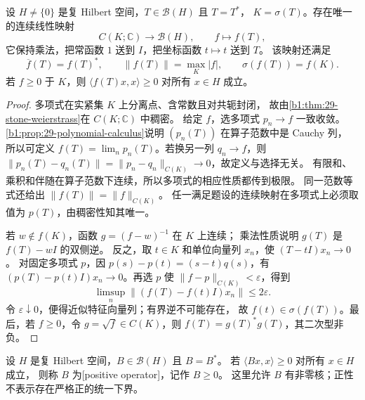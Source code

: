 \begin{theorem}[连续函数演算]
\label{b1:thm:29-continuous-calculus}
设 \(H\ne\{0\}\) 是复 Hilbert 空间，\(T\in\mathcal B(H)\) 且 \(T=T^*\)，
\(K=\sigma(T)\)。存在唯一的连续线性映射
\[
 C(K;\mathbb C)\longrightarrow\mathcal B(H),\qquad f\longmapsto f(T),
\]
它保持乘法，把常函数 \(1\) 送到 \(I\)，把坐标函数 \(t\mapsto t\) 送到 \(T\)。
该映射还满足
\[
 \overline f(T)=f(T)^*,\qquad
 \|f(T)\|=\max_K|f|,\qquad
 \sigma(f(T))=f(K).
\]
若 \(f\geq0\) 于 \(K\)，则 \(\langle f(T)x,x\rangle\geq0\) 对所有 \(x\in H\) 成立。
\end{theorem}
\begin{proof}
多项式在实紧集 \(K\) 上分离点、含常数且对共轭封闭，
故由\cref{b1:thm:29-stone-weierstrass}在 \(C(K;\mathbb C)\) 中稠密。
给定 \(f\)，选多项式 \(p_n\to f\) 一致收敛。
\cref{b1:prop:29-polynomial-calculus}说明 \((p_n(T))\) 在算子范数中是 Cauchy 列，
所以可定义 \(f(T)=\lim_n p_n(T)\)。若换另一列 \(q_n\to f\)，则
\(\|p_n(T)-q_n(T)\|=\|p_n-q_n\|_{C(K)}\to0\)，故定义与选择无关。
有限和、乘积和伴随在算子范数下连续，所以多项式的相应性质都传到极限。
同一范数等式还给出 \(\|f(T)\|=\|f\|_{C(K)}\)。
任一满足题设的连续映射在多项式上必须取值为 \(p(T)\)，由稠密性知其唯一。

若 \(w\notin f(K)\)，函数 \(g=(f-w)^{-1}\) 在 \(K\) 上连续；
乘法性质说明 \(g(T)\) 是 \(f(T)-wI\) 的双侧逆。
反之，取 \(t\in K\) 和单位向量列 \(x_n\)，使 \((T-tI)x_n\to0\)。
对固定多项式 \(p\)，因 \(p(s)-p(t)=(s-t)q(s)\)，有
\((p(T)-p(t)I)x_n\to0\)。再选 \(p\) 使 \(\|f-p\|_{C(K)}<\varepsilon\)，得到
\[
 \limsup_n\|(f(T)-f(t)I)x_n\|\leq2\varepsilon.
\]
令 \(\varepsilon\downarrow0\)，便得近似特征向量列；有界逆不可能存在，
故 \(f(t)\in\sigma(f(T))\)。最后，若 \(f\geq0\)，令 \(g=\sqrt f\in C(K)\)，则
\(f(T)=g(T)^*g(T)\)，其二次型非负。
\end{proof}

\begin{definition}[正算子]
\label{b1:def:29-positive-operator}
设 \(H\) 是复 Hilbert 空间，\(B\in\mathcal B(H)\) 且 \(B=B^*\)。
若 \(\langle Bx,x\rangle\geq0\) 对所有 \(x\in H\) 成立，
则称 \(B\) 为[positive operator]，记作 \(B\geq0\)。
这里允许 \(B\) 有非零核；正性不表示存在严格正的统一下界。
\end{definition}

